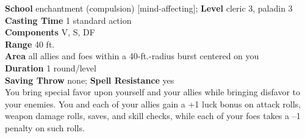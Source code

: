 \textbf{School} enchantment (compulsion) [mind-affecting]; \textbf{Level} cleric 3, paladin 3\\
\textbf{Casting Time} 1 standard action\\
\textbf{Components} V, S, DF\\
\textbf{Range} 40 ft.\\
\textbf{Area} all allies and foes within a 40-ft.-radius burst centered on you\\
\textbf{Duration} 1 round/level\\
\textbf{Saving Throw} none; \textbf{Spell Resistance} yes\\
You bring special favor upon yourself and your allies while bringing disfavor to your enemies. You and each of your allies gain a +1 luck bonus on attack rolls, weapon damage rolls, saves, and skill checks, while each of your foes takes a --1 penalty on such rolls.\\
